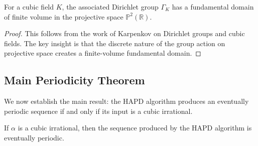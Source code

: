 \begin{theorem}\label{thm:finite_domain}
For a cubic field $K$, the associated Dirichlet group $\Gamma_K$ has a fundamental domain of finite volume in the projective space $\mathbb{P}^2(\mathbb{R})$.
\end{theorem}

\begin{proof}
This follows from the work of Karpenkov \cite{Karpenkov2022} on Dirichlet groups and cubic fields. The key insight is that the discrete nature of the group action on projective space creates a finite-volume fundamental domain.
\end{proof}

\subsection{Main Periodicity Theorem}

We now establish the main result: the HAPD algorithm produces an eventually periodic sequence if and only if its input is a cubic irrational.

\begin{theorem}\label{thm:cubic_periodic}
If $\alpha$ is a cubic irrational, then the sequence produced by the HAPD algorithm is eventually periodic.
\end{theorem}

